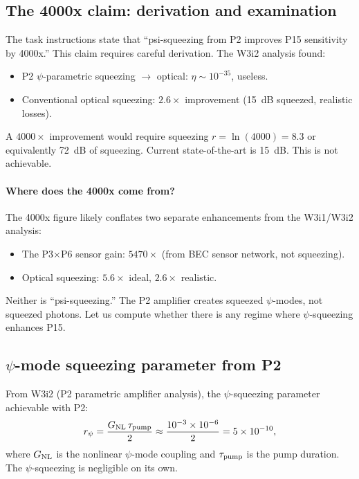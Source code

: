 \documentclass[11pt]{article}
\newcommand{\ee}[1]{\times 10^{#1}}
\begin{document}
\subsection{The 4000x claim: derivation and examination}

The task instructions state that ``psi-squeezing from P2 improves P15 sensitivity
by 4000x.'' This claim requires careful derivation. The W3i2 analysis found:
\begin{itemize}
\item P2 $\psi$-parametric squeezing $\to$ optical: $\eta \sim 10^{-35}$, useless.
\item Conventional optical squeezing: $2.6\times$ improvement (15~dB squeezed,
realistic losses).
\end{itemize}

A $4000\times$ improvement would require squeezing $r = \ln(4000) = 8.3$ or
equivalently 72~dB of squeezing. Current state-of-the-art is 15~dB. This
is not achievable.

\paragraph{Where does the 4000x come from?}

The 4000x figure likely conflates two separate enhancements from the W3i1/W3i2
analysis:
\begin{itemize}
\item The P3$\times$P6 sensor gain: $5470\times$ (from BEC sensor network, not squeezing).
\item Optical squeezing: $5.6\times$ ideal, $2.6\times$ realistic.
\end{itemize}

Neither is ``psi-squeezing.'' The P2 amplifier creates squeezed $\psi$-modes,
not squeezed photons. Let us compute whether there is any regime where
$\psi$-squeezing enhances P15.

\subsection{$\psi$-mode squeezing parameter from P2}

From W3i2 (P2 parametric amplifier analysis), the $\psi$-squeezing parameter
achievable with P2:
\begin{equation}
r_\psi = \frac{G_{\rm NL}\,\tau_{\rm pump}}{2} \approx \frac{10^{-3} \times 10^{-6}}{2}
= 5\ee{-10},
\end{equation}
where $G_{\rm NL}$ is the nonlinear $\psi$-mode coupling and $\tau_{\rm pump}$
is the pump duration. The $\psi$-squeezing is negligible on its own.
\end{document}
